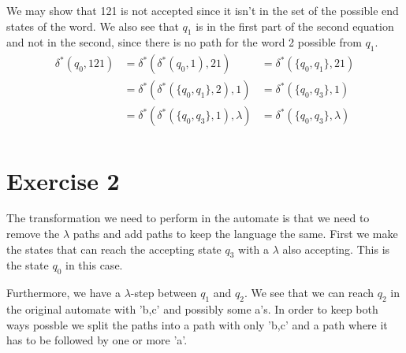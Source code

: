 \documentclass{article}
\begin{document}
We may show that 121 is not accepted since it isn't in the set of the possible end states of the word. We also see that $q_1$ is in the first part of the second equation and not in the second, since there is no path for the word 2 possible from $q_1$.
\begin{align*}
  \delta^* (q_0, 121)   &= \delta^* (\delta^*(q_0, 1), 21) &= \delta^* (\{q_0, q_1 \}, 21) \\
                        &= \delta^* (\delta^*(\{q_0, q_1 \}, 2), 1) &= \delta^* (\{q_0, q_3 \}, 1) \\
                        &= \delta^* (\delta^*(\{q_0, q_3 \}, 1), \lambda) &= \delta^* (\{q_0, q_3 \}, \lambda) \\
\end{align*}

\section*{Exercise 2}
The transformation we need to perform in the automate is that we need to remove the $\lambda$ paths and add paths to keep the language the same. First we make the states that can reach the accepting state $q_3$ with a $\lambda$ also accepting. This is the state $q_0$ in this case.

Furthermore, we have a $\lambda$-step between $q_1$ and $q_2$. We see that we can reach $q_2$ in the original automate with 'b,c' and possibly some a's. In order to keep both ways possble we split the paths into a path with only 'b,c' and a path where it has to be followed by one or more 'a'.
\end{document}
